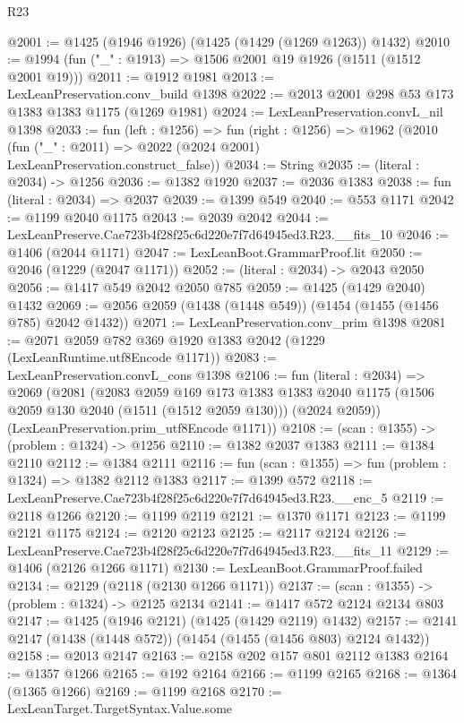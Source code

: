 \begin{lexlean}{R23}
\begin{coremodule}
@2001 := @1425 (@1946 @1926) (@1425 (@1429 (@1269 @1263)) @1432)
@2010 := @1994 (fun ("_" : @1913) => @1506 @2001 @19 @1926 (@1511 (@1512 @2001 @19)))
@2011 := @1912 @1981
@2013 := LexLeanPreservation.conv_build @1398
@2022 := @2013 @2001 @298 @53 @173 @1383 @1383 @1175 (@1269 @1981)
@2024 := LexLeanPreservation.convL_nil @1398
@2033 := fun (left : @1256) =>
  fun (right : @1256) =>
  @1962 (@2010 (fun ("_" : @2011) => @2022 (@2024 @2001) LexLeanPreservation.construct_false))
@2034 := String
@2035 := (literal : @2034) -> @1256
@2036 := @1382 @1920
@2037 := @2036 @1383
@2038 := fun (literal : @2034) => @2037
@2039 := @1399 @549
@2040 := @553 @1171
@2042 := @1199 @2040 @1175
@2043 := @2039 @2042
@2044 := LexLeanPreserve.Cae723b4f28f25c6d220e7f7d64945ed3.R23.__fits_10
@2046 := @1406 (@2044 @1171)
@2047 := LexLeanBoot.GrammarProof.lit
@2050 := @2046 (@1229 (@2047 @1171))
@2052 := (literal : @2034) -> @2043 @2050
@2056 := @1417 @549 @2042 @2050 @785
@2059 := @1425 (@1429 @2040) @1432
@2069 := @2056 @2059 (@1438 (@1448 @549)) (@1454 (@1455 (@1456 @785) @2042 @1432))
@2071 := LexLeanPreservation.conv_prim @1398
@2081 := @2071 @2059 @782 @369 @1920 @1383 @2042 (@1229 (LexLeanRuntime.utf8Encode @1171))
@2083 := LexLeanPreservation.convL_cons @1398
@2106 := fun (literal : @2034) =>
  @2069
    (@2081
      (@2083
        @2059
        @169
        @173
        @1383
        @1383
        @2040
        @1175
        (@1506 @2059 @130 @2040 (@1511 (@1512 @2059 @130)))
        (@2024 @2059))
      (LexLeanPreservation.prim_utf8Encode @1171))
@2108 := (scan : @1355) -> (problem : @1324) -> @1256
@2110 := @1382 @2037 @1383
@2111 := @1384 @2110
@2112 := @1384 @2111
@2116 := fun (scan : @1355) => fun (problem : @1324) => @1382 @2112 @1383
@2117 := @1399 @572
@2118 := LexLeanPreserve.Cae723b4f28f25c6d220e7f7d64945ed3.R23.__enc_5
@2119 := @2118 @1266
@2120 := @1199 @2119
@2121 := @1370 @1171
@2123 := @1199 @2121 @1175
@2124 := @2120 @2123
@2125 := @2117 @2124
@2126 := LexLeanPreserve.Cae723b4f28f25c6d220e7f7d64945ed3.R23.__fits_11
@2129 := @1406 (@2126 @1266 @1171)
@2130 := LexLeanBoot.GrammarProof.failed
@2134 := @2129 (@2118 (@2130 @1266 @1171))
@2137 := (scan : @1355) -> (problem : @1324) -> @2125 @2134
@2141 := @1417 @572 @2124 @2134 @803
@2147 := @1425 (@1946 @2121) (@1425 (@1429 @2119) @1432)
@2157 := @2141 @2147 (@1438 (@1448 @572)) (@1454 (@1455 (@1456 @803) @2124 @1432))
@2158 := @2013 @2147
@2163 := @2158 @202 @157 @801 @2112 @1383
@2164 := @1357 @1266
@2165 := @192 @2164
@2166 := @1199 @2165
@2168 := @1364 (@1365 @1266)
@2169 := @1199 @2168
@2170 := LexLeanTarget.TargetSyntax.Value.some

\end{coremodule}
\end{lexlean}

